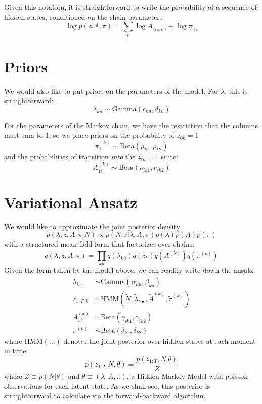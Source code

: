 \documentclass[11pt]{article}
\begin{document}
Given this notation, it is straightforward to write the probability of a sequence of hidden states, conditioned on the chain parameters
\begin{equation}
    \log p(z|A, \pi) = \sum_t \log A_{z_{t+1} z_t} + \log \pi_{z_0}
\end{equation}

\section{Priors}
We would also like to put priors on the parameters of the model. For $\lambda$, this is straightforward:
\begin{equation}
    \lambda_{ku} \sim \mathrm{Gamma}(c_{ku}, d_{ku})
\end{equation}

For the parameters of the Markov chain, we have the restriction that the columns must sum to 1, so we place priors on the probability of $z_{0k} = 1$
\begin{equation}
    \pi^{(k)}_1 \sim \mathrm{Beta}(\rho_{k1}, \rho_{k2})
\end{equation}
and the probabilities of transition \emph{into} the $z_{tk} = 1$ state:
\begin{equation}
    A^{(k)}_{1i} \sim \mathrm{Beta}(\nu_{ik1}, \nu_{ik2})
\end{equation}

\section{Variational Ansatz}
We would like to approximate the joint posterior density
\begin{equation}
    p(\lambda, z, A, \pi|N) \propto p(N, z|\lambda, A, \pi) p(\lambda) p(A) p(\pi)
\end{equation}
with a structured mean field form that factorizes over chains:
\begin{equation}
     q(\lambda, z, A, \pi) = \prod_{ku} q(\lambda_{ku}) q(z_k) q(A^{(k)}) q(\pi^{(k)})
\end{equation} 
Given the form taken by the model above, we can readily write down the ansatz
\begin{align} 
    \lambda_{ku} &\sim \mathrm{Gamma}(\alpha_{ku}, \beta_{ku}) \\
    z_{1:T, k} &\sim \mathrm{HMM}(\tilde{N}, \tilde{\lambda}_{k\bullet}, \tilde{A}^{(k)}, \tilde{\pi}^{(k)}) \\
    A^{(k)}_{1i} &\sim \mathrm{Beta}(\gamma_{ik1}, \gamma_{ik2}) \\
    \pi^{(k)} &\sim \mathrm{Beta}(\delta_{k1}, \delta_{k2})
\end{align}
where $\mathrm{HMM}(\ldots)$ denotes the joint posterior over hidden states at each moment in time:
\begin{equation}
    p(z_{1:T}|N, \theta) = \frac{p(z_{1:T}, N|\theta)}{Z}
\end{equation}
where $Z \equiv p(N|\theta)$ and $\theta \equiv (\lambda, A, \pi)$.
a Hidden Markov Model with poisson observations for each latent state. As we shall see, this posterior is straightforward to calculate via the forward-backward algorithm.
\end{document}
